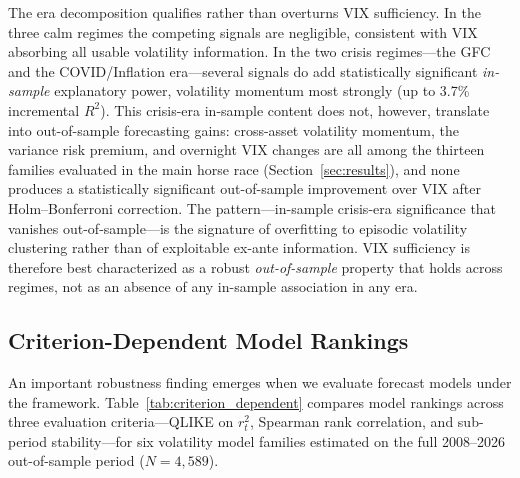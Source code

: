 \documentclass[12pt,a4paper]{article}
\begin{document}
The era decomposition qualifies rather than overturns VIX sufficiency. In the three calm regimes the competing signals are negligible, consistent with VIX absorbing all usable volatility information. In the two crisis regimes---the GFC and the COVID/Inflation era---several signals do add statistically significant \emph{in-sample} explanatory power, volatility momentum most strongly (up to 3.7\% incremental $R^2$). This crisis-era in-sample content does not, however, translate into out-of-sample forecasting gains: cross-asset volatility momentum, the variance risk premium, and overnight VIX changes are all among the thirteen families evaluated in the main horse race (Section~\ref{sec:results}), and none produces a statistically significant out-of-sample improvement over VIX after Holm--Bonferroni correction. The pattern---in-sample crisis-era significance that vanishes out-of-sample---is the signature of overfitting to episodic volatility clustering rather than of exploitable ex-ante information. VIX sufficiency is therefore best characterized as a robust \emph{out-of-sample} property that holds across regimes, not as an absence of any in-sample association in any era.

\subsection{Criterion-Dependent Model Rankings}
\label{sec:criterion_dependent}

An important robustness finding emerges when we evaluate forecast models under the \citet{patton2011} framework. Table~\ref{tab:criterion_dependent} compares model rankings across three evaluation criteria---QLIKE on $r_t^2$, Spearman rank correlation, and sub-period stability---for six volatility model families estimated on the full 2008--2026 out-of-sample period ($N = 4{,}589$).
\end{document}
